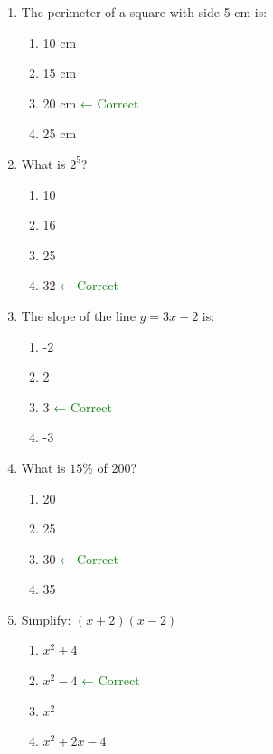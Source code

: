 \documentclass[12pt]{article}
\begin{document}
\begin{enumerate}[label=\textbf{\arabic*.}]
\item The perimeter of a square with side 5 cm is:
\begin{enumerate}[label=\Alph*)]
    \item 10 cm
    \item 15 cm
    \item 20 cm \textcolor{green}{← Correct}
    \item 25 cm
\end{enumerate}

\item What is $2^5$?
\begin{enumerate}[label=\Alph*)]
    \item 10
    \item 16
    \item 25
    \item 32 \textcolor{green}{← Correct}
\end{enumerate}

\item The slope of the line $y = 3x - 2$ is:
\begin{enumerate}[label=\Alph*)]
    \item -2
    \item 2
    \item 3 \textcolor{green}{← Correct}
    \item -3
\end{enumerate}

\item What is $15\%$ of $200$?
\begin{enumerate}[label=\Alph*)]
    \item 20
    \item 25
    \item 30 \textcolor{green}{← Correct}
    \item 35
\end{enumerate}

\item Simplify: $(x + 2)(x - 2)$
\begin{enumerate}[label=\Alph*)]
    \item $x^2 + 4$
    \item $x^2 - 4$ \textcolor{green}{← Correct}
    \item $x^2$
    \item $x^2 + 2x - 4$
\end{enumerate}

\end{enumerate}

\newpage
\end{document}
